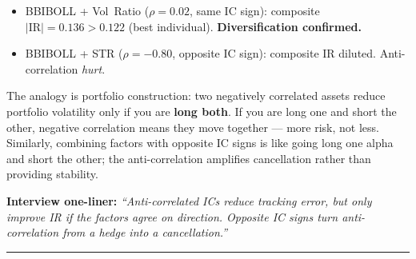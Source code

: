 \documentclass[a4paper, 11pt]{report}
\theoremstyle{definition}
\theoremstyle{remark}
\begin{document}
\begin{description}[style=nextline, leftmargin=1.8cm]
    \item[Experimental Evidence]
        \begin{itemize}[nosep]
            \item BBIBOLL + Vol~Ratio ($\rho = 0.02$, same IC sign):
                  composite $|\mathrm{IR}| = 0.136 > 0.122$ (best individual).
                  \textbf{Diversification confirmed.}
            \item BBIBOLL + STR ($\rho = -0.80$, opposite IC sign):
                  composite IR diluted.  Anti-correlation \emph{hurt}.
        \end{itemize}

    \item[Why It Matters]
        The analogy is portfolio construction: two negatively correlated
        assets reduce portfolio volatility only if you are \textbf{long both}.
        If you are long one and short the other, negative correlation means
        they move together --- more risk, not less.
        Similarly, combining factors with opposite IC signs is like going
        long one alpha and short the other; the anti-correlation amplifies
        cancellation rather than providing stability.

        \medskip
        \textbf{Interview one-liner:}
        \emph{``Anti-correlated ICs reduce tracking error, but only improve IR
        if the factors agree on direction.
        Opposite IC signs turn anti-correlation from a hedge into
        a cancellation.''}
\end{description}

\bigskip\noindent\rule{\textwidth}{0.4pt}
\end{document}

